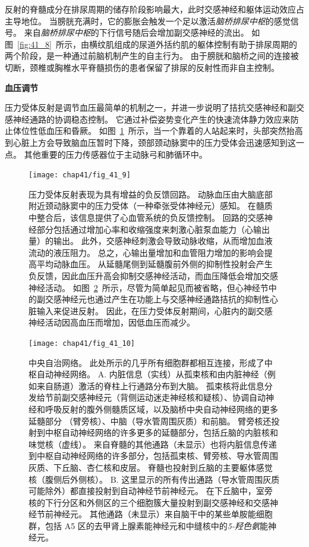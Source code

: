 反射的脊髓成分在排尿周期的储存阶段影响最大，此时交感神经和躯体运动效应占主导地位。
当膀胱充满时，它的膨胀会触发一个足以激活\textit{脑桥排尿中枢}的感觉信号。
来自\textit{脑桥排尿中枢}的下行信号随后会增加副交感神经的流出。
如图~\ref{fig:41_8}~所示，由横纹肌组成的尿道外括约肌的躯体控制有助于排尿周期的两个阶段，是一种通过前脑机制产生的自主行为。
由于膀胱和脑桥之间的连接被切断，颈椎或胸椎水平脊髓损伤的患者保留了排尿的反射性而非自主控制。


\textbf{血压调节}

压力受体反射是调节血压最简单的机制之一，并进一步说明了拮抗交感神经和副交感神经通路的协调稳态控制。
它通过补偿姿势变化产生的快速流体静力效应来防止体位性低血压和昏厥。
如图~\ref{fig:41_9}~所示，当一个靠着的人站起来时，头部突然抬高到心脏上方会导致脑血压暂时下降，颈部颈动脉窦中的压力受体会迅速感知到这一点。
其他重要的压力传感器位于主动脉弓和肺循环中。


\begin{figure}[htbp]
	\centering
	\texttt{[image: chap41/fig\_41\_9]}
	\caption{压力受体反射表现为具有增益的负反馈回路。
		动脉血压由大脑底部附近颈动脉窦中的压力受体（一种牵张受体神经元）感知。
		在髓质中整合后，该信息提供了心血管系统的负反馈控制。
		回路的交感神经部分包括通过增加心率和收缩强度来刺激心脏泵血能力（心输出量）的输出。
		此外，交感神经刺激会导致动脉收缩，从而增加血液流动的液压阻力。
		总之，心输出量增加和血管阻力增加的影响会提高平均动脉血压。
		从延髓尾侧到延髓腹前外侧的抑制性投射会产生负反馈，因此血压升高会抑制交感神经活动，而血压降低会增加交感神经活动。
		如图~\ref{fig:41_10}~所示，尽管为简单起见而被省略，但心神经节中的副交感神经元也通过产生在功能上与交感神经通路拮抗的抑制性心脏输入来促进反射。
		因此，在压力受体反射期间，心脏内的副交感神经活动因高血压而增加，因低血压而减少。}
	\label{fig:41_9}
\end{figure}


\begin{figure}[htbp]
	\centering
	\texttt{[image: chap41/fig\_41\_10]}
	\caption{中央自治网络。
		此处所示的几乎所有细胞群都相互连接，形成了中枢自动神经网络。
		A. 内脏信息（实线）从孤束核和由内脏神经（例如来自肠道）激活的脊柱上行通路分布到大脑。
		孤束核将此信息分发给节前副交感神经元（背侧运动迷走神经核和疑核）、协调自动神经和呼吸反射的腹外侧髓质区域，以及脑桥中央自动神经网络的更多延髓部分 （臂旁核）、中脑（导水管周围灰质）和前脑。
		臂旁核还投射到中枢自动神经网络的许多更多的延髓部分，包括丘脑的内脏核和味觉核（虚线）。
		来自脊髓的其他通路（未显示）也将内脏信息传递到中枢自动神经网络的许多部分，包括孤束核、臂旁核、导水管周围灰质、下丘脑、杏仁核和皮层。
		脊髓也投射到丘脑的主要躯体感觉核（腹侧后外侧核）。
		B. 这里显示的所有传出通路（导水管周围灰质可能除外）都直接投射到自动神经节前神经元。
		在下丘脑中，室旁核的下行分区和外侧区的三个细胞簇大量投射到副交感神经和交感神经节前神经元。
		其他通路（未显示）来自脑干中的某些单胺能细胞群，包括 A5 区的去甲肾上腺素能神经元和中缝核中的\textit{5-羟色氨}能神经元。}
	\label{fig:41_10}
\end{figure}


